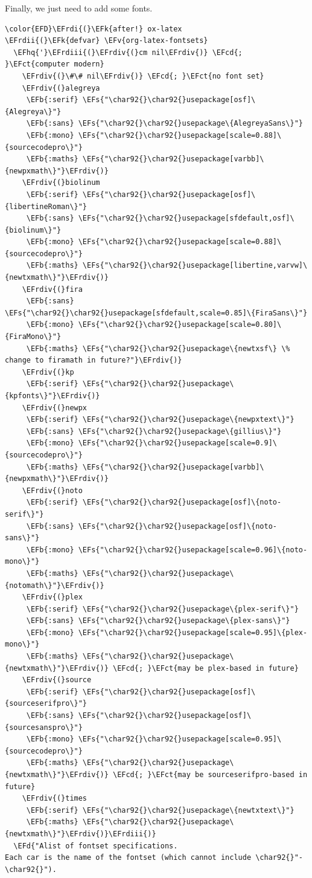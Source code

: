\documentclass{scrartcl}
\newcommand{\EFk}[1]{\textcolor{EFk}{#1}} %
\newcommand{\EFd}[1]{\textcolor{EFd}{#1}} %
\newcommand{\EFs}[1]{\textcolor{EFs}{#1}} %
\newcommand{\EFb}[1]{\textcolor{EFb}{#1}} %
\newcommand{\EFct}[1]{\textcolor{EFct}{#1}} %
\newcommand{\EFv}[1]{\textcolor{EFv}{#1}} %
\newcommand{\EFcd}[1]{\textcolor{EFcd}{#1}} %
\newcommand{\EFhq}[1]{#1} %
\newcommand{\EFrdi}[1]{#1} %
\newcommand{\EFrdii}[1]{#1} %
\newcommand{\EFrdiii}[1]{#1} %
\newcommand{\EFrdiv}[1]{#1} %
\begin{document}
Finally, we just need to add some fonts.

\begin{Code}
\begin{Verbatim}[]
\color{EFD}\EFrdi{(}\EFk{after!} ox-latex
\EFrdii{(}\EFk{defvar} \EFv{org-latex-fontsets}
  \EFhq{'}\EFrdiii{(}\EFrdiv{(}cm nil\EFrdiv{)} \EFcd{; }\EFct{computer modern}
    \EFrdiv{(}\#\# nil\EFrdiv{)} \EFcd{; }\EFct{no font set}
    \EFrdiv{(}alegreya
     \EFb{:serif} \EFs{"\char92{}\char92{}usepackage[osf]\{Alegreya\}"}
     \EFb{:sans} \EFs{"\char92{}\char92{}usepackage\{AlegreyaSans\}"}
     \EFb{:mono} \EFs{"\char92{}\char92{}usepackage[scale=0.88]\{sourcecodepro\}"}
     \EFb{:maths} \EFs{"\char92{}\char92{}usepackage[varbb]\{newpxmath\}"}\EFrdiv{)}
    \EFrdiv{(}biolinum
     \EFb{:serif} \EFs{"\char92{}\char92{}usepackage[osf]\{libertineRoman\}"}
     \EFb{:sans} \EFs{"\char92{}\char92{}usepackage[sfdefault,osf]\{biolinum\}"}
     \EFb{:mono} \EFs{"\char92{}\char92{}usepackage[scale=0.88]\{sourcecodepro\}"}
     \EFb{:maths} \EFs{"\char92{}\char92{}usepackage[libertine,varvw]\{newtxmath\}"}\EFrdiv{)}
    \EFrdiv{(}fira
     \EFb{:sans} \EFs{"\char92{}\char92{}usepackage[sfdefault,scale=0.85]\{FiraSans\}"}
     \EFb{:mono} \EFs{"\char92{}\char92{}usepackage[scale=0.80]\{FiraMono\}"}
     \EFb{:maths} \EFs{"\char92{}\char92{}usepackage\{newtxsf\} \% change to firamath in future?"}\EFrdiv{)}
    \EFrdiv{(}kp
     \EFb{:serif} \EFs{"\char92{}\char92{}usepackage\{kpfonts\}"}\EFrdiv{)}
    \EFrdiv{(}newpx
     \EFb{:serif} \EFs{"\char92{}\char92{}usepackage\{newpxtext\}"}
     \EFb{:sans} \EFs{"\char92{}\char92{}usepackage\{gillius\}"}
     \EFb{:mono} \EFs{"\char92{}\char92{}usepackage[scale=0.9]\{sourcecodepro\}"}
     \EFb{:maths} \EFs{"\char92{}\char92{}usepackage[varbb]\{newpxmath\}"}\EFrdiv{)}
    \EFrdiv{(}noto
     \EFb{:serif} \EFs{"\char92{}\char92{}usepackage[osf]\{noto-serif\}"}
     \EFb{:sans} \EFs{"\char92{}\char92{}usepackage[osf]\{noto-sans\}"}
     \EFb{:mono} \EFs{"\char92{}\char92{}usepackage[scale=0.96]\{noto-mono\}"}
     \EFb{:maths} \EFs{"\char92{}\char92{}usepackage\{notomath\}"}\EFrdiv{)}
    \EFrdiv{(}plex
     \EFb{:serif} \EFs{"\char92{}\char92{}usepackage\{plex-serif\}"}
     \EFb{:sans} \EFs{"\char92{}\char92{}usepackage\{plex-sans\}"}
     \EFb{:mono} \EFs{"\char92{}\char92{}usepackage[scale=0.95]\{plex-mono\}"}
     \EFb{:maths} \EFs{"\char92{}\char92{}usepackage\{newtxmath\}"}\EFrdiv{)} \EFcd{; }\EFct{may be plex-based in future}
    \EFrdiv{(}source
     \EFb{:serif} \EFs{"\char92{}\char92{}usepackage[osf]\{sourceserifpro\}"}
     \EFb{:sans} \EFs{"\char92{}\char92{}usepackage[osf]\{sourcesanspro\}"}
     \EFb{:mono} \EFs{"\char92{}\char92{}usepackage[scale=0.95]\{sourcecodepro\}"}
     \EFb{:maths} \EFs{"\char92{}\char92{}usepackage\{newtxmath\}"}\EFrdiv{)} \EFcd{; }\EFct{may be sourceserifpro-based in future}
    \EFrdiv{(}times
     \EFb{:serif} \EFs{"\char92{}\char92{}usepackage\{newtxtext\}"}
     \EFb{:maths} \EFs{"\char92{}\char92{}usepackage\{newtxmath\}"}\EFrdiv{)}\EFrdiii{)}
  \EFd{"Alist of fontset specifications.
Each car is the name of the fontset (which cannot include \char92{}"-\char92{}").


\end{Verbatim}
\end{Code}
\end{document}
